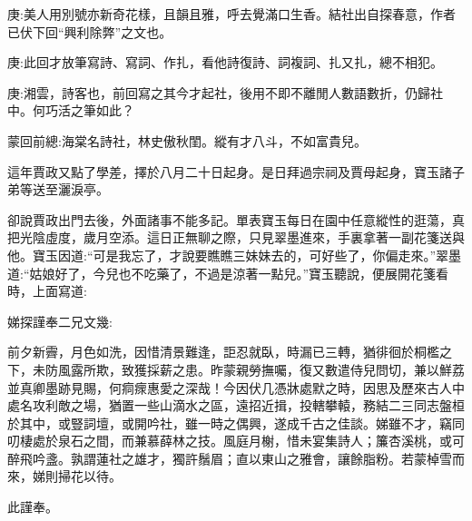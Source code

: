 
\begin{parag}
    \begin{note}庚:美人用別號亦新奇花樣，且韻且雅，呼去覺滿口生香。結社出自探春意，作者已伏下回“興利除弊”之文也。\end{note}
\end{parag}


\begin{parag}
    \begin{note}庚:此回才放筆寫詩、寫詞、作扎，看他詩復詩、詞複詞、扎又扎，總不相犯。\end{note}
\end{parag}


\begin{parag}
    \begin{note}庚:湘雲，詩客也，前回寫之其今才起社，後用不即不離閒人數語數折，仍歸社中。何巧活之筆如此？\end{note}
\end{parag}


\begin{parag}
    \begin{note}蒙回前總:海棠名詩社，林史傲秋閨。縱有才八斗，不如富貴兒。\end{note}
\end{parag}


\begin{parag}
    這年賈政又點了學差，擇於八月二十日起身。是日拜過宗祠及賈母起身，寶玉諸子弟等送至灑淚亭。
\end{parag}


\begin{parag}
    卻說賈政出門去後，外面諸事不能多記。單表寶玉每日在園中任意縱性的逛蕩，真把光陰虛度，歲月空添。這日正無聊之際，只見翠墨進來，手裏拿著一副花箋送與他。寶玉因道:“可是我忘了，才說要瞧瞧三妹妹去的，可好些了，你偏走來。”翠墨道:“姑娘好了，今兒也不吃藥了，不過是涼著一點兒。”寶玉聽說，便展開花箋看時，上面寫道:
\end{parag}


\begin{qute}
    娣探謹奉二兄文幾:
    \begin{parag}
        前夕新霽，月色如洗，因惜清景難逢，詎忍就臥，時漏已三轉，猶徘徊於桐檻之下，未防風露所欺，致獲採薪之患。昨蒙親勞撫囑，復又數遣侍兒問切，兼以鮮荔並真卿墨跡見賜，何痌瘝惠愛之深哉！今因伏几憑牀處默之時，因思及歷來古人中處名攻利敵之場，猶置一些山滴水之區，遠招近揖，投轄攀轅，務結二三同志盤桓於其中，或豎詞壇，或開吟社，雖一時之偶興，遂成千古之佳談。娣雖不才，竊同叨棲處於泉石之間，而兼慕薛林之技。風庭月榭，惜未宴集詩人；簾杏溪桃，或可醉飛吟盞。孰謂蓮社之雄才，獨許鬚眉；直以東山之雅會，讓餘脂粉。若蒙棹雪而來，娣則掃花以待。
    \end{parag}
    \begin{parag}
        此謹奉。
    \end{parag}
\end{qute}



